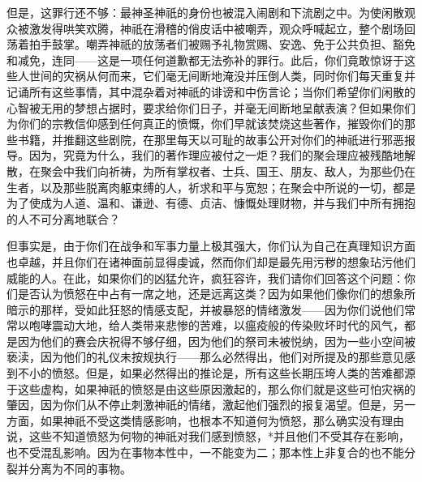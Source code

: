 但是，这罪行还不够：最神圣神祇的身份也被混入闹剧和下流剧之中。为使闲散观众被激发得哄笑欢腾，神祇在滑稽的俏皮话中被嘲弄，观众呼喊起立，整个剧场回荡着拍手鼓掌。嘲弄神祇的放荡者们被赐予礼物赏赐、安逸、免于公共负担、豁免和减免，连同——这是一项任何道歉都无法弥补的罪行。此后，你们竟敢惊讶于这些人世间的灾祸从何而来，它们毫无间断地淹没并压倒人类，同时你们每天重复并记诵所有这些事情，其中混杂着对神祇的诽谤和中伤言论；当你们希望你们闲散的心智被无用的梦想占据时，要求给你们日子，并毫无间断地呈献表演？但如果你们为你们的宗教信仰感到任何真正的愤慨，你们早就该焚烧这些著作，摧毁你们的那些书籍，并推翻这些剧院，在那里每天以可耻的故事公开对你们的神祇进行邪恶报导。因为，究竟为什么，我们的著作理应被付之一炬？我们的聚会理应被残酷地解散，在聚会中我们向祈祷，为所有掌权者、士兵、国王、朋友、敌人，为那些仍在生者，以及那些脱离肉躯束缚的人，祈求和平与宽恕；在聚会中所说的一切，都是为了使成为人道、温和、谦逊、有德、贞洁、慷慨处理财物，并与我们中所有拥抱的人不可分离地联合？\par

但事实是，由于你们在战争和军事力量上极其强大，你们认为自己在真理知识方面也卓越，并且你们在诸神面前显得虔诚，然而你们却是最先用污秽的想象玷污他们威能的人。在此，如果你们的凶猛允许，疯狂容许，我们请你们回答这个问题：你们是否认为愤怒在中占有一席之地，还是远离这类？因为如果他们像你们的想象所暗示的那样，受如此狂怒的情感支配，并被暴怒的情绪激发——因为你们说他们常常以咆哮震动大地，给人类带来悲惨的苦难，以瘟疫般的传染败坏时代的风气，都是因为他们的赛会庆祝得不够仔细，因为他们的祭司未被悦纳，因为一些小空间被亵渎，因为他们的礼仪未按规执行——那么必然得出，他们对所提及的那些意见感到不小的愤怒。但是，如果必然得出的推论是，所有这些长期压垮人类的苦难都源于这些虚构，如果神祇的愤怒是由这些原因激起的，那么你们就是这些可怕灾祸的肇因，因为你们从不停止刺激神祇的情绪，激起他们强烈的报复渴望。但是，另一方面，如果神祇不受这类情感影响，也根本不知道何为愤怒，那么确实没有理由说，这些不知道愤怒为何物的神祇对我们感到愤怒，*并且他们不受其存在影响，也不受混乱影响。因为在事物本性中，一不能变为二；那本性上非复合的也不能分裂并分离为不同的事物。\par


